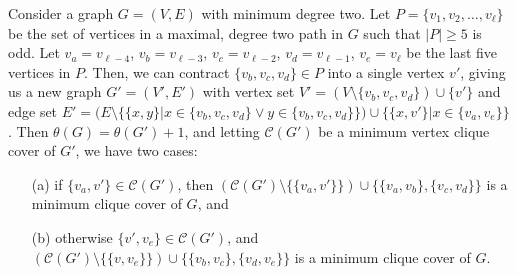 \documentclass[../techreport.tex]{subfiles}
\begin{document}
\begin{lemma}
	Consider a graph $G = (V, E)$ with minimum degree two. Let $P = \{v_1, v_2, \dots, v_{\ell}\}$ be the set of vertices in a maximal, degree two path in $G$ such that $|P| \geq 5$ is odd. Let $v_a = v_{\ell - 4}$, $v_b = v_{\ell - 3}$, $v_c = v_{\ell - 2}$, $v_d = v_{\ell - 1}$, $v_e = v_{\ell}$ be the last five vertices in $P$. Then, we can contract $\{v_b, v_c, v_d\} \in P$ into a single vertex $v'$, giving us a new graph $G' = (V', E')$ with vertex set $V' = (V \setminus \{v_b, v_c, v_d\}) \cup \{v'\}$ and edge set $E' = (E \setminus \{\{x, y\}| x \in \{v_b, v_c, v_d\} \lor y \in \{v_b, v_c, v_d\}\}) \cup \{\{x, v'\}| x \in \{v_a, v_e\}\}$. Then $\theta(G) = \theta(G') + 1$, and letting $\mathcal{C}(G')$ be a minimum vertex clique cover of $G'$, we have two cases:
	\begin{itemize}
		\item[(a)] if $\{v_a, v'\} \in \mathcal{C}(G')$, then $(\mathcal{C}(G') \setminus \{\{v_a, v'\}\}) \cup \{\{v_a, v_b\}, \{v_c, v_d\}\}$ is a minimum clique cover of $G$, and

		\item[(b)] otherwise $\{v', v_e\} \in \mathcal{C}(G')$, and $(\mathcal{C}(G') \setminus \{\{v, v_e\}\}) \cup \{\{v_b, v_c\}, \{v_d, v_e\}\}$ is a minimum clique cover of $G$.
	\end{itemize}
\end{lemma}

\newtheorem{claim}{Claim}
\end{document}
